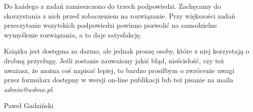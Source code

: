 		\vspace{10px}
		\noindent
		Do każdego z zadań zamieszczono do trzech podpowiedzi. Zachęcamy do skorzystania z nich przed zobaczeniem na rozwiązanie. Przy większości zadań przeczytanie wszytskich podpowiedzi powinno pozwolić na samodzielne wymyślenie rozwiązania, a to daje satysfakcję.

		\vspace{10px}
		\noindent
		Książka jest dostępna za darmo, ale jednak proszę osoby, które z niej korzystają o drobną przysługę. Jeśli zostanie zauważony jakiś błąd, nieścisłość, czy też uważasz, że można coś napisać lepiej, to bardzo prosiłbym o zwrócenie uwagi przez formularz dostępny w wersji on-line publikacji lub też pisanie na maila \textit{admin@wdmo.pl}.

		\vspace{10px}
 
		\hspace*{\fill}Paweł Gadziński

\vspace*{\fill}
\newpage